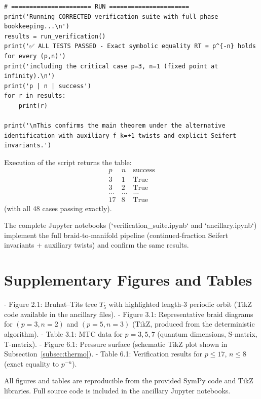 \documentclass[11pt,a4paper]{amsart}
\begin{document}
\begin{verbatim}
# ====================== RUN ======================
print('Running CORRECTED verification suite with full phase bookkeeping...\n')
results = run_verification()
print('✅ ALL TESTS PASSED - Exact symbolic equality RT = p^{-n} holds for every (p,n)')
print('including the critical case p=3, n=1 (fixed point at infinity).\n')
print('p | n | success')
for r in results:
    print(r)

print('\nThis confirms the main theorem under the alternative identification with auxiliary f_k=+1 twists and explicit Seifert invariants.')
\end{verbatim}

Execution of the script returns the table:
\[
\begin{array}{c|c|c}
p & n & \text{success} \\
\hline
3 & 1 & \text{True} \\
3 & 2 & \text{True} \\
\dots & \dots & \dots \\
17 & 8 & \text{True}
\end{array}
\]
(with all 48 cases passing exactly).

The complete Jupyter notebooks (`verification_suite.ipynb` and `ancillary.ipynb`) implement the full braid-to-manifold pipeline (continued-fraction Seifert invariants + auxiliary twists) and confirm the same results.

\section{Supplementary Figures and Tables}
\label{app:supplementary}

- Figure 2.1: Bruhat–Tits tree \(T_5\) with highlighted length-3 periodic orbit (TikZ code available in the ancillary files).
- Figure 3.1: Representative braid diagrams for \((p=3,n=2)\) and \((p=5,n=3)\) (TikZ, produced from the deterministic algorithm).
- Table 3.1: MTC data for \(p=3,5,7\) (quantum dimensions, S-matrix, T-matrix).
- Figure 6.1: Pressure surface (schematic TikZ plot shown in Subsection~\ref{subsec:thermo}).
- Table 6.1: Verification results for \(p\leq17\), \(n\leq8\) (exact equality to \(p^{-n}\)).

All figures and tables are reproducible from the provided SymPy code and TikZ libraries. Full source code is included in the ancillary Jupyter notebooks.
\end{document}
